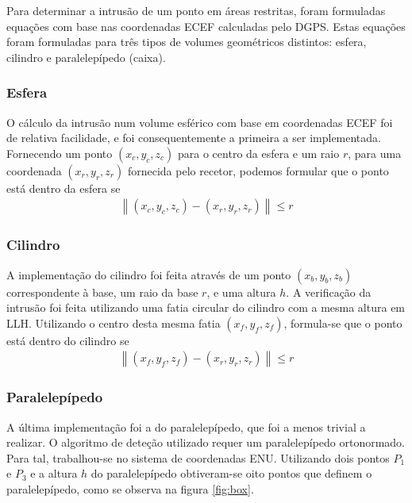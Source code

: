 \documentclass{article}
\begin{document}
Para determinar a intrusão de um ponto em áreas restritas, foram
formuladas equações com base nas coordenadas ECEF calculadas pelo
DGPS. Estas equações foram formuladas para três tipos de volumes
geométricos distintos: esfera, cilindro e paralelepípedo (caixa).

\subsubsection{Esfera}

O cálculo da intrusão num volume esférico com base em coordenadas
ECEF foi de relativa facilidade, e foi consequentemente a primeira a
ser implementada. Fornecendo um ponto $(x_c,y_c,z_c)$ para o centro
da esfera e um raio $r$, para uma coordenada $(x_r,y_r,z_r)$
fornecida pelo recetor, podemos formular que o ponto está dentro da 
esfera se
\begin{gather*}
	\left\lVert(x_c,y_c,z_c) - (x_r,y_r,z_r)\right\rVert \leq r
\end{gather*}

\subsubsection{Cilindro}

A implementação do cilindro foi feita através de um ponto $(x_b,y_b,
z_b)$ correspondente à base, um raio da base $r$, e uma altura $h$.
A verificação da intrusão foi feita utilizando uma fatia circular do
cilindro com a mesma altura em LLH. Utilizando o centro desta mesma fatia
$(x_f,y_f,z_f)$, formula-se que o ponto está dentro do cilindro se
\begin{gather*}
	\left\lVert(x_f,y_f,z_f) - (x_r,y_r,z_r)\right\rVert \leq r
\end{gather*}

\subsubsection{Paralelepípedo}

A última implementação foi a do paralelepípedo, que foi a menos trivial a
realizar. O algoritmo de deteção utilizado requer um paralelepípedo
ortonormado. Para tal, trabalhou-se no sistema de coordenadas ENU.
Utilizando dois pontos $P_1$ e $P_3$ e a altura $h$ do
paralelepípedo obtiveram-se oito pontos que definem o paralelepípedo,
como se observa na figura \ref{fig:box}.

\end{document}
